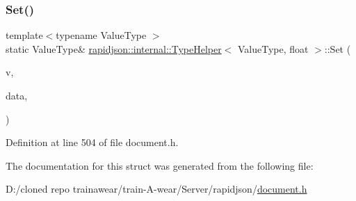 \subsubsection{\texorpdfstring{Set()}{Set()}\hspace{0.1cm}{\footnotesize\ttfamily [2/2]}}
{\footnotesize\ttfamily template$<$typename Value\+Type $>$ \\
static Value\+Type\& \mbox{\hyperlink{structrapidjson_1_1internal_1_1_type_helper}{rapidjson\+::internal\+::\+Type\+Helper}}$<$ Value\+Type, float $>$\+::Set (\begin{DoxyParamCaption}\item[{Value\+Type \&}]{v,  }\item[{float}]{data,  }\item[{typename Value\+Type\+::\+Allocator\+Type \&}]{ }\end{DoxyParamCaption})\hspace{0.3cm}{\ttfamily [static]}}



Definition at line 504 of file document.\+h.


\begin{DoxyCode}{0}

\end{DoxyCode}


The documentation for this struct was generated from the following file\+:\begin{DoxyCompactItemize}
\item 
D\+:/cloned repo trainawear/train-\/\+A-\/wear/\+Server/rapidjson/\mbox{\hyperlink{document_8h}{document.\+h}}\end{DoxyCompactItemize}
